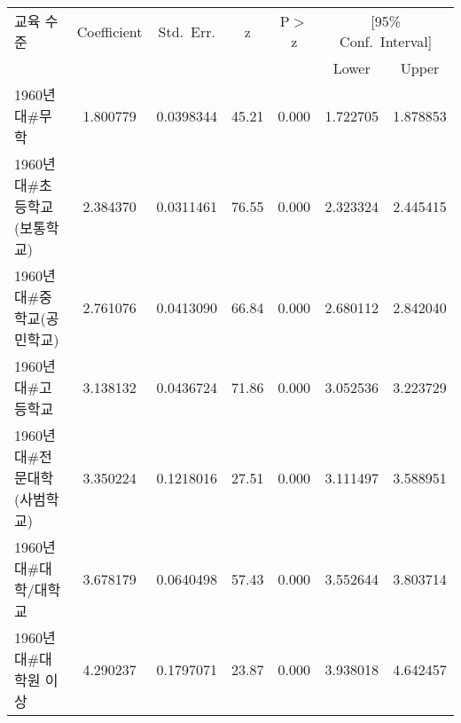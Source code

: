 \begin{tabular}{lcccccc}
\toprule
교육 수준 & Coefficient & Std.~Err. & z & P$>$z & \multicolumn{2}{c}{[95\% Conf.~Interval]} \\
\cmidrule(lr){6-7}
 &  &  &  &  & Lower & Upper \\
\midrule
1960년대\#무학 & 1.800779 & 0.0398344 & 45.21 & 0.000 & 1.722705 & 1.878853 \\
1960년대\#초등학교(보통학교) & 2.384370 & 0.0311461 & 76.55 & 0.000 & 2.323324 & 2.445415 \\
1960년대\#중학교(공민학교) & 2.761076 & 0.0413090 & 66.84 & 0.000 & 2.680112 & 2.842040 \\
1960년대\#고등학교 & 3.138132 & 0.0436724 & 71.86 & 0.000 & 3.052536 & 3.223729 \\
1960년대\#전문대학(사범학교) & 3.350224 & 0.1218016 & 27.51 & 0.000 & 3.111497 & 3.588951 \\
1960년대\#대학/대학교 & 3.678179 & 0.0640498 & 57.43 & 0.000 & 3.552644 & 3.803714 \\
1960년대\#대학원 이상 & 4.290237 & 0.1797071 & 23.87 & 0.000 & 3.938018 & 4.642457 \\
\bottomrule
\end{tabular}
